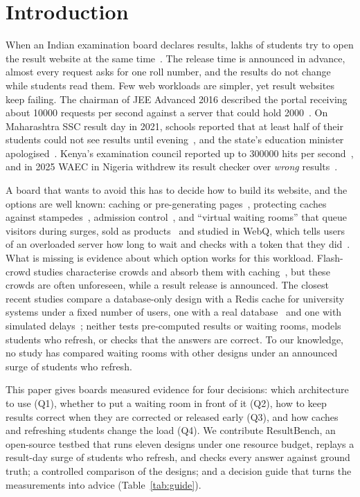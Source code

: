 \section{Introduction}

When an Indian examination board declares results, lakhs of students try to
open the result website at the same time~\cite{ht2021ssc}. The release time is
announced in advance, almost every request asks for one roll number, and the
results do not change while students read them. Few web workloads are
simpler, yet result websites keep failing. The chairman of JEE Advanced 2016
described the portal receiving about \num{10000} requests per second against
a server that could hold \num{2000}~\cite{pagalguy2016jee}. On Maharashtra SSC
result day in 2021, schools reported that at least half of their students
could not see results until evening~\cite{ht2021ssc}, and the state's
education minister apologised~\cite{careerindia2021ssc}. Kenya's examination
council reported up to \num{300000} hits per second~\cite{knec2025x}, and in
2025 WAEC in Nigeria withdrew its result checker over \emph{wrong}
results~\cite{icir2025waec}.

A board that wants to avoid this has to decide how to build its website, and
the options are well known: caching or pre-generating
pages~\cite{challenger1999scalable,labrinidis2000webview}, protecting caches
against stampedes~\cite{vattani2015xfetch,nishtala2013memcache}, admission
control~\cite{welsh2001seda,elnikety2004gatekeeper,chen2005news}, and
``virtual waiting rooms'' that queue visitors during surges, sold as
products~\cite{cloudflare2026wr,aws2022vwr} and studied in WebQ, which tells
users of an overloaded server how long to wait and checks with a token that
they did~\cite{doshi2015webq}. What is missing is evidence about which option
works for this workload. Flash-crowd studies characterise crowds and absorb
them with caching~\cite{ari2003flash,jung2002flash,wendell2011going}, but
these crowds are often unforeseen, while a result release is announced. The closest recent studies compare a database-only design with a
Redis cache for university systems under a fixed number of users, one with a
real database~\cite{putranto2026redis} and one with simulated
delays~\cite{tofan2026cacheaside}; neither tests pre-computed results or
waiting rooms, models students who refresh, or checks that the answers are
correct. To our knowledge, no study has compared waiting rooms with other
designs under an announced surge of students who refresh.

This paper gives boards measured evidence for four decisions: which
architecture to use (Q1), whether to put a waiting room in front of it (Q2),
how to keep results correct when they are corrected or released early (Q3),
and how caches and refreshing students change the load (Q4). We contribute
ResultBench, an open-source testbed that runs eleven designs under one
resource budget, replays a result-day surge of students who refresh, and
checks every answer against ground truth; a controlled comparison of the
designs; and a decision guide that turns the measurements into advice
(Table~\ref{tab:guide}).
